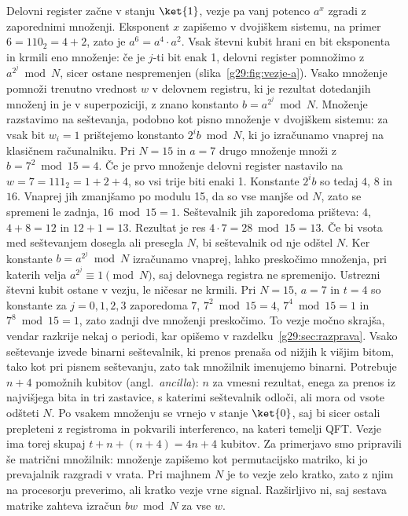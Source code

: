  Delovni register začne v stanju $\ket{1}$, vezje pa vanj potenco $a^x$ zgradi z zaporednimi množenji. Eksponent $x$ zapišemo v dvojiškem sistemu, na primer $6 = 110_2 = 4 + 2$, zato je $a^6 = a^4 \cdot a^2$. Vsak števni kubit hrani en bit eksponenta in krmili eno množenje: če je $j$-ti bit enak 1, delovni register pomnožimo z $a^{2^j} \bmod N$, sicer ostane nespremenjen (slika~\ref{g29:fig:vezje-a}). Vsako množenje pomnoži trenutno vrednost $w$ v delovnem registru, ki je rezultat dotedanjih množenj in je v superpoziciji, z znano konstanto $b = a^{2^j} \bmod N$. Množenje razstavimo na seštevanja, podobno kot pisno množenje v dvojiškem sistemu: za vsak bit $w_i = 1$ prištejemo konstanto $2^i b \bmod N$, ki jo izračunamo vnaprej na klasičnem računalniku. Pri $N = 15$ in $a = 7$ drugo množenje množi z $b = 7^2 \bmod 15 = 4$. Če je prvo množenje delovni register nastavilo na $w = 7 = 111_2 = 1 + 2 + 4$, so vsi trije biti enaki 1. Konstante $2^i b$ so tedaj $4$, $8$ in $16$. Vnaprej jih zmanjšamo po modulu 15, da so vse manjše od $N$, zato se spremeni le zadnja, $16 \bmod 15 = 1$. Seštevalnik jih zaporedoma prišteva: $4$, $4 + 8 = 12$ in $12 + 1 = 13$. Rezultat je res $4 \cdot 7 = 28 \bmod 15 = 13$. Če bi vsota med seštevanjem dosegla ali presegla $N$, bi seštevalnik od nje odštel $N$. Ker konstante $b = a^{2^j} \bmod N$ izračunamo vnaprej, lahko preskočimo množenja, pri katerih velja $a^{2^j} \equiv 1 \pmod N$, saj delovnega registra ne spremenijo. Ustrezni števni kubit ostane v vezju, le ničesar ne krmili. Pri $N = 15$, $a = 7$ in $t = 4$ so konstante za $j = 0, 1, 2, 3$ zaporedoma $7$, $7^2 \bmod 15 = 4$, $7^4 \bmod 15 = 1$ in $7^8 \bmod 15 = 1$, zato zadnji dve množenji preskočimo. To vezje močno skrajša, vendar razkrije nekaj o periodi, kar opišemo v razdelku~\ref{g29:sec:razprava}. Vsako seštevanje izvede binarni seštevalnik, ki prenos prenaša od nižjih k višjim bitom, tako kot pri pisnem seštevanju, zato tak množilnik imenujemo binarni. Potrebuje $n+4$ pomožnih kubitov (angl.\ \emph{ancilla}): $n$ za vmesni rezultat, enega za prenos iz najvišjega bita in tri zastavice, s katerimi seštevalnik odloči, ali mora od vsote odšteti $N$. Po vsakem množenju se vrnejo v stanje $\ket{0}$, saj bi sicer ostali prepleteni z registroma in pokvarili interferenco, na kateri temelji QFT. Vezje ima torej skupaj $t + n + (n+4) = 4n+4$ kubitov. Za primerjavo smo pripravili še matrični množilnik: množenje zapišemo kot permutacijsko matriko, ki jo prevajalnik razgradi v vrata. Pri majhnem $N$ je to vezje zelo kratko, zato z njim na procesorju preverimo, ali kratko vezje vrne signal. Razširljivo ni, saj sestava matrike zahteva izračun $bw \bmod N$ za vse $w$.

